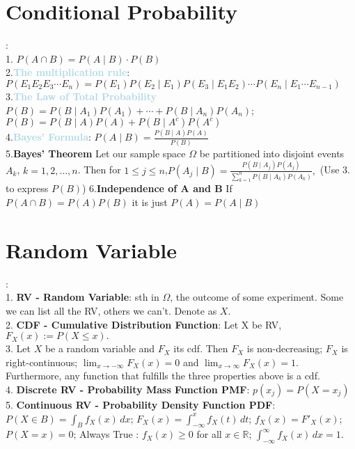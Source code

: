 \documentclass[twocolumn]{article}
\newcommand{\method}[1]{\textbf{\textcolor{lightblue}{#1}}}
\newcommand{\sectionspace}{\vspace*{1em}}
\begin{document}
\section{Conditional Probability}
:\\
1. $ P(A \cap B) = P(A \mid B) \cdot P(B)$\\
2.\method{\textbf{The multiplication rule}}:$P(E_1 E_2 E_3 \cdots E_n) = P(E_1) P(E_2 \mid E_1) P(E_3 \mid E_1 E_2) \cdots P(E_n \mid E_1 \cdots E_{n-1})$\\
3.\method{\textbf{The Law of Total Probability}} $P(B) = P(B \mid A_1) P(A_1) + \cdots + P(B \mid A_n) P(A_n)$; $P(B) = P(B \mid A) P(A) + P(B \mid A^c) P(A^c)$\\
4.\method{\textbf{Bayes' Formula}}: $P(A \mid B) = \frac{P(B \mid A) P(A)}{P(B)}$\\
5.\textbf{Bayes' Theorem} Let our sample space $\Omega$ be partitioned into disjoint events $A_k$, $k = 1, 2, \ldots, n$. Then for $1 \leq j \leq n$,$P(A_j \mid B) = \frac{P(B \mid A_j) P(A_j)}{\sum_{k=1}^n P(B \mid A_k) P(A_k)}, $ (Use 3. to express $P(B)$)
6.\textbf{Independence of A and B} If $P(A \cap B) = P(A)P(B)$ it is just $P(A) = P(A\mid B)$ 

\sectionspace

\section{Random Variable}
:\\
1. \textbf{RV - Random Variable}: sth in $\Omega$, the outcome of some experiment. Some we can list all the RV, others we can't. Denote as $X$.\\
2. \textbf{CDF - Cumulative Distribution Function}:   Let X be RV, $F_X(x) := P(X \leq x).$\\
3. Let $X$ be a random variable and $F_X$ its cdf. Then  $F_X$ is non-decreasing; $F_X$ is right-continuous;  $\lim_{x \to -\infty} F_X(x) = 0$ and $\lim_{x \to \infty} F_X(x) = 1$. Furthermore, any function that fulfills the three properties above is a cdf.\\
4. \textbf{Discrete RV - Probability Mass Function PMF}: $p(x_{j}) = P(X = x_{j})$\\
5. \textbf{Continuous RV - Probability Density Function PDF}: $P(X \in B) = \int_B f_X(x) \, dx$; $F_X(x) = \int_{-\infty}^x f_X(t) \, dt$; $f_X(x) = F'_X(x)$; $P(X = x) = 0$; Always True : $f_X(x) \geq 0$ for all $x \in \mathbb{R}$; $\int_{-\infty}^{\infty} f_X(x) \, dx = 1$.

\sectionspace
\end{document}
